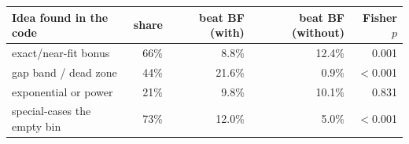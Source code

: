 \begin{tabular}{lrrrr}
\toprule
Idea found in the code & share & beat BF (with) & beat BF (without) & Fisher $p$ \\
\midrule
exact/near-fit bonus & 66\% & 8.8\% & 12.4\% & 0.001 \\
gap band / dead zone & 44\% & 21.6\% & 0.9\% & $<$0.001 \\
exponential or power & 21\% & 9.8\% & 10.1\% & 0.831 \\
special-cases the empty bin & 73\% & 12.0\% & 5.0\% & $<$0.001 \\
\bottomrule
\end{tabular}
